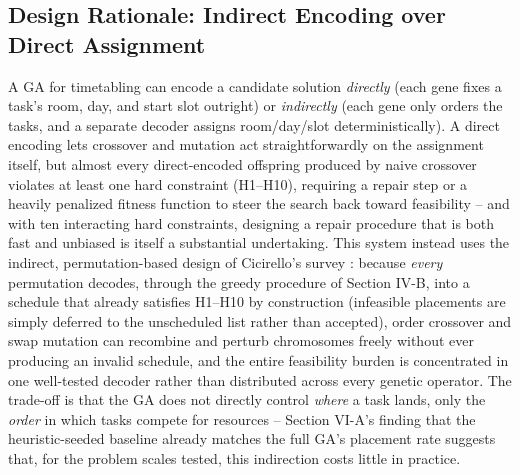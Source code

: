 \documentclass[conference]{IEEEtran}
\begin{document}
\subsection{Design Rationale: Indirect Encoding over Direct Assignment}
A GA for timetabling can encode a candidate solution \emph{directly} (each gene fixes a task's room, day, and start slot outright) or \emph{indirectly} (each gene only orders the tasks, and a separate decoder assigns room/day/slot deterministically). A direct encoding lets crossover and mutation act straightforwardly on the assignment itself, but almost every direct-encoded offspring produced by naive crossover violates at least one hard constraint (H1--H10), requiring a repair step or a heavily penalized fitness function to steer the search back toward feasibility -- and with ten interacting hard constraints, designing a repair procedure that is both fast and unbiased is itself a substantial undertaking. This system instead uses the indirect, permutation-based design of Cicirello's survey \cite{cicirello2023}: because \emph{every} permutation decodes, through the greedy procedure of Section IV-B, into a schedule that already satisfies H1--H10 by construction (infeasible placements are simply deferred to the unscheduled list rather than accepted), order crossover and swap mutation can recombine and perturb chromosomes freely without ever producing an invalid schedule, and the entire feasibility burden is concentrated in one well-tested decoder rather than distributed across every genetic operator. The trade-off is that the GA does not directly control \emph{where} a task lands, only the \emph{order} in which tasks compete for resources -- Section VI-A's finding that the heuristic-seeded baseline already matches the full GA's placement rate suggests that, for the problem scales tested, this indirection costs little in practice.
\end{document}
